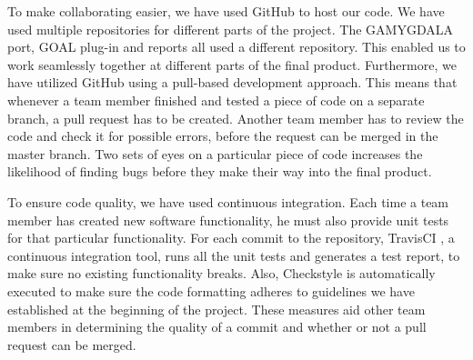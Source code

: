 To make collaborating easier, we have used GitHub \citep{gh} to host our code. We have used multiple repositories for different parts of the project. The GAMYGDALA port, GOAL plug-in and reports all used a different repository. This enabled us to work seamlessly together at different parts of the final product. Furthermore, we have utilized GitHub using a pull-based development approach. This means that whenever a team member finished and tested a piece of code on a separate branch, a pull request has to be created. Another team member has to review the code and check it for possible errors, before the request can be merged in the master branch. Two sets of eyes on a particular piece of code increases the likelihood of finding bugs before they make their way into the final product. 

To ensure code quality, we have used continuous integration. Each time a team member has created new software functionality, he must also provide unit tests for that particular functionality. For each commit to the repository, TravisCI \citep{travis}, a continuous integration tool, runs all the unit tests and generates a test report, to make sure no existing functionality breaks. Also, Checkstyle is automatically executed to make sure the code formatting adheres to guidelines we have established at the beginning of the project. These measures aid other team members in determining the quality of a commit and whether or not a pull request can be merged.
